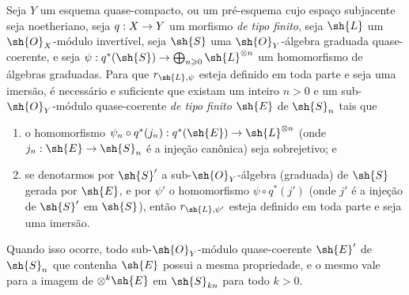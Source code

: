 \documentclass[oneside,10pt]{amsart}
\makeatletter
\renewcommand{\geq}{\geqslant}
\newcommand{\ega@arrow}[2]{\mathchoice{#1}{#2}{#2}{#2}}
\renewcommand{\to}{\ega@arrow{\longrightarrow}{\rightarrow}}
\let\EGAOriginalLabel\label
\renewcommand{\label}[1]{\phantomsection\EGAOriginalLabel{#1}}
\makeatother
\begin{document}
\begin{proposition}[3.8.5]
\label{II.3.8.5}
Seja $Y$ um esquema quase-compacto, ou um pré-esquema cujo espaço subjacente seja noetheriano, seja $q:X\to Y$ um morfismo \emph{de tipo finito}, seja $\sh{L}$ um $\sh{O}_X$-módulo invertível, seja $\sh{S}$ uma $\sh{O}_Y$-álgebra graduada quase-coerente, e seja $\psi:q^*(\sh{S})\to\bigoplus_{n\geq0}\sh{L}^{\otimes n}$ um homomorfismo de álgebras graduadas.
Para que $r_{\sh{L},\psi}$ esteja definido em toda parte e seja uma imersão, é necessário e suficiente que existam um inteiro $n>0$ e um sub-$\sh{O}_Y$-módulo quase-coerente \emph{de tipo finito} $\sh{E}$ de $\sh{S}_n$ tais que
\begin{enumerate}
  \item[a)] o homomorfismo $\psi_n\circ q^*(j_n):q^*(\sh{E})\to\sh{L}^{\otimes n}$ (onde $j_n:\sh{E}\to\sh{S}_n$ é a injeção canônica) seja sobrejetivo; e
  \item[b)] se denotarmos por $\sh{S}'$ a sub-$\sh{O}_Y$-álgebra (graduada) de $\sh{S}$ gerada por $\sh{E}$, e por $\psi'$ o homomorfismo $\psi\circ q^*(j')$ (onde $j'$ é a injeção de $\sh{S}'$ em $\sh{S}$), então $r_{\sh{L},\psi'}$ esteja definido em toda parte e seja uma imersão.
\end{enumerate}

Quando isso ocorre, todo sub-$\sh{O}_Y$-módulo quase-coerente $\sh{E}'$ de $\sh{S}_n$ que contenha $\sh{E}$ possui a mesma propriedade, e o mesmo vale para a imagem de $\otimes^k\sh{E}$ em $\sh{S}_{kn}$ para todo $k>0$.
\end{proposition}
\end{document}
